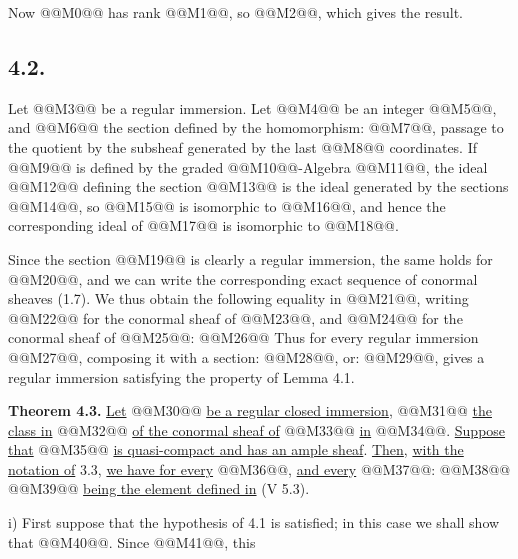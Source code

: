 Now @@M0@@ has rank @@M1@@, so @@M2@@, which gives the result.

\subsection*{4.2.}

Let @@M3@@ be a regular immersion. Let @@M4@@ be an integer @@M5@@, and @@M6@@ the section defined by the homomorphism: @@M7@@, passage to the quotient by the subsheaf generated by the last @@M8@@ coordinates. If @@M9@@ is defined by the graded @@M10@@-Algebra @@M11@@, the ideal @@M12@@ defining the section @@M13@@ is the ideal generated by the sections @@M14@@, so @@M15@@ is isomorphic to @@M16@@, and hence the corresponding ideal of @@M17@@ is isomorphic to @@M18@@.

Since the section @@M19@@ is clearly a regular immersion, the same holds for @@M20@@, and we can write the corresponding exact sequence of conormal sheaves (1.7). We thus obtain the following equality in @@M21@@, writing @@M22@@ for the conormal sheaf of @@M23@@, and @@M24@@ for the conormal sheaf of @@M25@@:
@@M26@@
Thus for every regular immersion @@M27@@, composing it with a section: @@M28@@, or: @@M29@@, gives a regular immersion satisfying the property of Lemma 4.1.

\textbf{Theorem 4.3.} \uline{Let} @@M30@@ \uline{be a regular closed immersion}, @@M31@@ \uline{the class in} @@M32@@ \uline{of the conormal sheaf of} @@M33@@ \uline{in} @@M34@@. \uline{Suppose that} @@M35@@ \uline{is quasi-compact and has an ample sheaf}. \uline{Then}, \uline{with the notation of} 3.3, \uline{we have for every} @@M36@@, \uline{and every} @@M37@@:
@@M38@@
@@M39@@ \uline{being the element defined in} (V 5.3).

i) First suppose that the hypothesis of 4.1 is satisfied; in this case we shall show that @@M40@@. Since @@M41@@, this
